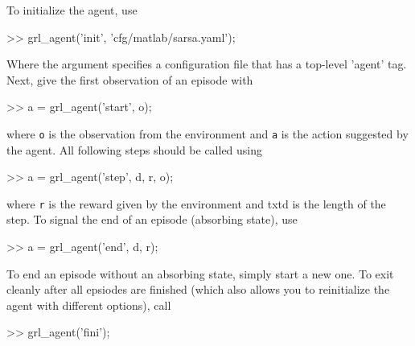 \documentclass{article}
\newcommand{\txt}[1]{\texttt{#1}}
\newenvironment{code}{\alltt}{\endalltt}
\begin{document}
To initialize the agent, use

\begin{code}
>> grl_agent('init', 'cfg/matlab/sarsa.yaml');
\end{code}

Where the argument specifies a configuration file that has a top-level
'agent' tag. Next, give the first observation of an episode with

\begin{code}
>> a = grl_agent('start', o);
\end{code}

where \txt{o} is the observation from the environment and \txt{a} is the
action suggested by the agent. All following steps should be called using

\begin{code}
>> a = grl_agent('step', d, r, o);
\end{code}

where \txt{r} is the reward given by the environment and 
txt{d} is the length of the step. To signal the end of
an episode (absorbing state), use

\begin{code}
>> a = grl_agent('end', d, r);
\end{code}

To end an episode without an absorbing state, simply start a new one. To
exit cleanly after all epsiodes are finished (which also allows you to
reinitialize the agent with different options), call

\begin{code}
>> grl_agent('fini');
\end{code}

\appendix


\end{document}
